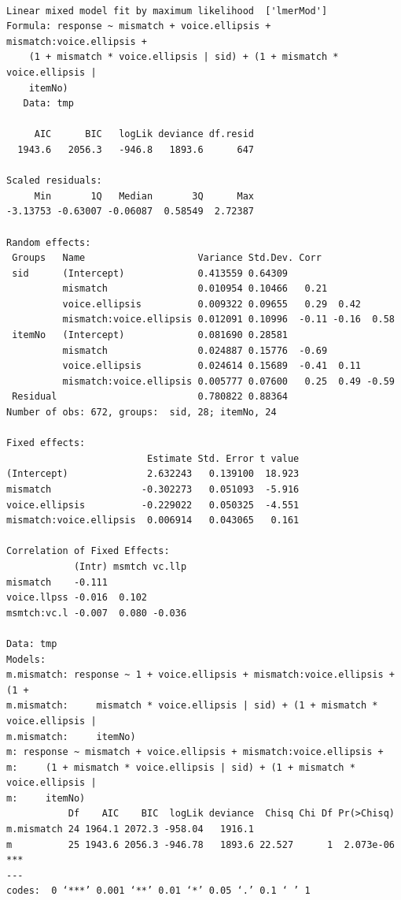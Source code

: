 \documentclass[11pt]{article}
\begin{document}
\begin{verbatim}

Linear mixed model fit by maximum likelihood  ['lmerMod']
Formula: response ~ mismatch + voice.ellipsis + mismatch:voice.ellipsis +  
    (1 + mismatch * voice.ellipsis | sid) + (1 + mismatch * voice.ellipsis |  
    itemNo)
   Data: tmp

     AIC      BIC   logLik deviance df.resid 
  1943.6   2056.3   -946.8   1893.6      647 

Scaled residuals: 
     Min       1Q   Median       3Q      Max 
-3.13753 -0.63007 -0.06087  0.58549  2.72387 

Random effects:
 Groups   Name                    Variance Std.Dev. Corr             
 sid      (Intercept)             0.413559 0.64309                   
          mismatch                0.010954 0.10466   0.21            
          voice.ellipsis          0.009322 0.09655   0.29  0.42      
          mismatch:voice.ellipsis 0.012091 0.10996  -0.11 -0.16  0.58
 itemNo   (Intercept)             0.081690 0.28581                   
          mismatch                0.024887 0.15776  -0.69            
          voice.ellipsis          0.024614 0.15689  -0.41  0.11      
          mismatch:voice.ellipsis 0.005777 0.07600   0.25  0.49 -0.59
 Residual                         0.780822 0.88364                   
Number of obs: 672, groups:  sid, 28; itemNo, 24

Fixed effects:
                         Estimate Std. Error t value
(Intercept)              2.632243   0.139100  18.923
mismatch                -0.302273   0.051093  -5.916
voice.ellipsis          -0.229022   0.050325  -4.551
mismatch:voice.ellipsis  0.006914   0.043065   0.161

Correlation of Fixed Effects:
            (Intr) msmtch vc.llp
mismatch    -0.111              
voice.llpss -0.016  0.102       
msmtch:vc.l -0.007  0.080 -0.036

Data: tmp
Models:
m.mismatch: response ~ 1 + voice.ellipsis + mismatch:voice.ellipsis + (1 + 
m.mismatch:     mismatch * voice.ellipsis | sid) + (1 + mismatch * voice.ellipsis | 
m.mismatch:     itemNo)
m: response ~ mismatch + voice.ellipsis + mismatch:voice.ellipsis + 
m:     (1 + mismatch * voice.ellipsis | sid) + (1 + mismatch * voice.ellipsis | 
m:     itemNo)
           Df    AIC    BIC  logLik deviance  Chisq Chi Df Pr(>Chisq)    
m.mismatch 24 1964.1 2072.3 -958.04   1916.1                             
m          25 1943.6 2056.3 -946.78   1893.6 22.527      1  2.073e-06 ***
---
codes:  0 ‘***’ 0.001 ‘**’ 0.01 ‘*’ 0.05 ‘.’ 0.1 ‘ ’ 1


\end{verbatim}
\end{document}
